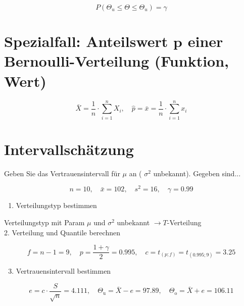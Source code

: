 \documentclass[10pt]{article}
\begin{document}
$$
P\left(\Theta_{u} \leq \Theta \leq \Theta_{u}\right)=\gamma
$$

\section*{Spezialfall: Anteilswert $\boldsymbol{p}$ einer Bernoulli-Verteilung (Funktion, Wert)}
$$
\bar{X}=\frac{1}{n} \cdot \sum_{i=1}^{n} X_{i}, \quad \hat{p}=\bar{x}=\frac{1}{n} \cdot \sum_{i=1}^{n} x_{i}
$$

\section*{Intervallschätzung}
Geben Sie das Vertrauensintervall für $\mu$ an ( $\sigma^{2}$ unbekannt). Gegeben sind...

$$
n=10, \quad \bar{x}=102, \quad s^{2}=16, \quad \gamma=0.99
$$

\begin{enumerate}
  \item Verteilungstyp bestimmen
\end{enumerate}

Verteilungstyp mit Param $\mu$ und $\sigma^{2}$ unbekannt $\rightarrow T$-Verteilung\\
2. Verteilung und Quantile berechnen

$$
f=n-1=9, \quad p=\frac{1+\gamma}{2}=0.995, \quad c=t_{(p ; f)}=t_{(0.995 ; 9)}=3.25
$$

\begin{enumerate}
  \setcounter{enumi}{2}
  \item Vertrauensintervall bestimmen
\end{enumerate}

$$
e=c \cdot \frac{S}{\sqrt{n}}=4.111, \quad \Theta_{\mathrm{u}}=\bar{X}-e=97.89, \quad \Theta_{\mathrm{o}}=\bar{X}+e=106.11
$$
\end{document}
